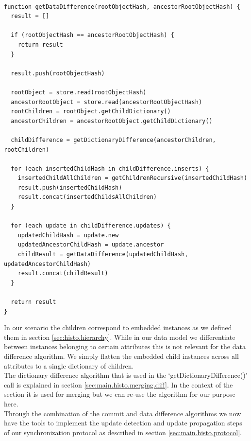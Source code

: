\begin{lstlisting}[caption=Detecting data difference across commits, label=data-difference]

function getDataDifference(rootObjectHash, ancestorRootObjectHash) {
  result = []

  if (rootObjectHash == ancestorRootObjectHash) {
    return result
  }

  result.push(rootObjectHash)

  rootObject = store.read(rootObjectHash)
  ancestorRootObject = store.read(ancestorRootObjectHash)
  rootChildren = rootObject.getChildDictionary()
  ancestorChildren = ancestorRootObject.getChildDictionary()

  childDifference = getDictionaryDifference(ancestorChildren, rootChildren)

  for (each insertedChildHash in childDifference.inserts) {
    insertedChildAllChildren = getChildrenRecursive(insertedChildHash)
    result.push(insertedChildHash)
    result.concat(insertedChildsAllChildren)
  }

  for (each update in childDifference.updates) {
    updatedChildHash = update.new
    updatedAncestorChildHash = update.ancestor
    childResult = getDataDifference(updatedChildHash, updatedAncestorChildHash)
    result.concat(childResult)
  }

  return result
}

\end{lstlisting}

In our scenario the children correspond to embedded instances as we defined them in section \ref{sec:histo.hierarchy}.
While in our data model we differentiate between instances belonging to certain attributes this is not relevant for the data difference algorithm.
We simply flatten the embedded child instances across all attributes to a single dictionary of children.\\
The dictionary difference algorithm that is used in the `getDictionaryDifference()' call is explained in section \ref{sec:main.histo.merging.diff}.
In the context of the section it is used for merging but we can re-use the algorithm for our purpose here.\\
Through the combination of the commit and data difference algorithms we now have the tools to implement the update detection and update propagation steps of our synchronization protocol as described in section \ref{sec:main.histo.protocol}.

